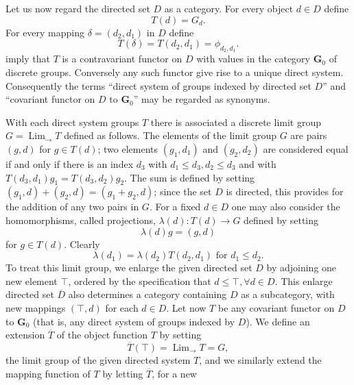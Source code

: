 \documentclass[11pt,a4paper]{report}
\DeclareMathOperator{\Lim}{Lim}
\begin{document}
Let us now regard the directed set $D$ as a category. For every object $d\in D$ define
\begin{equation*}
	T(d)= G_d.
\end{equation*}
For every mapping $\delta=(d_2,d_1)$ in $D$ define
\begin{equation*}
	T(\delta)=T(d_2,d_1)= \phi_{d_2,d_1}.
\end{equation*}
 imply that $T$ is a contravariant functor on $D$ with values in the category $\mathbf{G}_0$ of discrete
groups. Conversely any such functor give rise to a unique direct system. Consequently the terms ``direct system of groups indexed by
directed set $D$'' and ``covariant functor on $D$ to $\mathbf{G}_0$'' may be regarded as synonyms.

With each direct system groups $T$ there is associated a discrete limit group $G=\Lim_{\rightarrow} T$ defined as follows.
The elements of the limit group $G$ are pairs $(g,d)$ for $g\in T(d)$; two elements $(g_1,d_1)$ and $(g_2,d_2)$ are considered equal
if and only if there is an index $d_3$ with $d_1\le d_3, d_2\le d_3$ and with $T(d_3,d_1)g_1 = T(d_3,d_2)g_2$. The sum is defined
by setting $(g_1,d)+(g_2,d)= (g_1+g_2,d)$; since the set $D$ is directed, this provides for the addition of any two pairs in
$G$. For a fixed $d\in D$ one may also consider the homomorphisms, called projections, $\lambda(d):T(d)\rightarrow G$ defined by
setting
\begin{equation}\label{eq:dir-proj}
	\lambda(d)g= (g,d)
\end{equation}
for $g\in T(d)$. Clearly
\begin{equation}\label{eq:dir-proj2}
	\lambda(d_1) = \lambda(d_2)T(d_2,d_1)\text{ for } d_1\le d_2.
\end{equation}
To treat this limit group, we enlarge the given directed set $D$ by adjoining one new element $\top$, ordered by the specification 
that $d\le\top,\forall d\in D$. This enlarge directed set $\overline{D}$ also determines a category containing $D$ as a subcategory, with
new mappings $(\top,d)$ for each $d\in D$. Let now $T$ be any covariant functor on $D$ to $\mathbf{G}_0$ (that is, any direct system
of groups indexed by $D$). We define an extension $\overline{T}$ of the object function $T$ by setting
\begin{equation}\label{eq:dir-ext}
	\overline{T}(\top)=\Lim_{\rightarrow} T = G,
\end{equation}
the limit group of the given directed system $T$, and we similarly extend the mapping function of $T$ by letting $\overline{T}$, for a new
\end{document}
